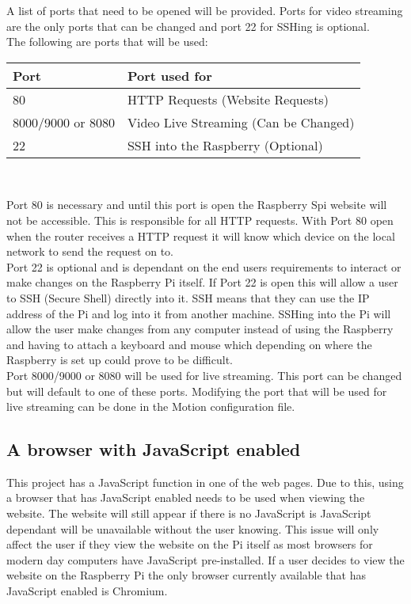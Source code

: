 \documentclass[12pt]{report}
\begin{document}
A list of ports that need to be opened will be provided. Ports for video streaming are the only ports that can be changed and port 22 for SSHing is optional. \\

The following are ports that will be used:

\begin{center}
    \begin{tabular}{ | l | p{7cm} |}
    \hline
    {\bf Port} & {\bf Port used for} \\ \hline
   80 & HTTP Requests (Website Requests) \\ \hline 
   8000/9000 or 8080 & Video Live Streaming (Can be Changed)\\ \hline
	22 & SSH into the Raspberry (Optional) \\ \hline
    \end{tabular}
    \\[0.5cm]
\end{center} 

Port 80 is necessary and until this port is open the Raspberry Spi website will not be accessible. This is responsible for all HTTP requests. With Port 80 open when the router receives a HTTP request it will know which device on the local network to send the request on to.\\

Port 22 is optional and is dependant on the end users requirements to interact or make changes on the Raspberry Pi itself. If Port 22 is open this will allow a user to SSH (Secure Shell) directly into it. SSH means that they can use the IP address of the Pi and log into it from another machine. SSHing into the Pi will allow the user make changes from any computer instead of using the Raspberry and having to attach a keyboard and mouse which depending on where the Raspberry is set up could prove to be difficult.\\

Port 8000/9000 or 8080 will be used for live streaming. This port can be changed but will default to one of these ports. Modifying the port that will be used for live streaming can be done in the Motion configuration file.\\

\noindent
\subsection{A browser with JavaScript enabled}
\label{subsec:javascript}
This project has a JavaScript function in one of the web pages. Due to this, using a browser that has JavaScript enabled needs to be used when viewing the website. The website will still appear if there is no JavaScript is JavaScript dependant will be unavailable without the user knowing.  This issue will only affect the user if they view the website on the Pi itself as most browsers for modern day computers have JavaScript pre-installed. If a user decides to view the website on the Raspberry Pi the only browser currently available that has JavaScript enabled is Chromium.\\
%
%
\end{document}
